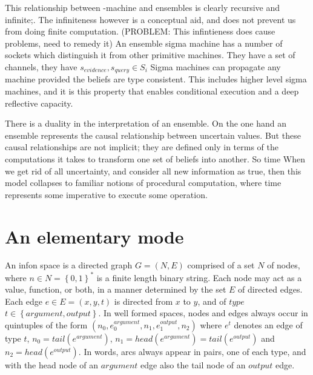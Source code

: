 This relationship between \sigma-machine and ensembles is clearly recursive and infinite;.  The infiniteness however is a conceptual aid, and does not prevent us from doing finite computation. (PROBLEM: This infintieness does cause problems, need to remedy it)
An ensemble sigma machine has a number of sockets which distinguish it from other primitive machines.  They have a set of channels, they have $s_{evidence}, s_{query} \in S_i$
Sigma machines can propagate any machine provided the beliefs are type consistent.
This includes higher level sigma machines, and it is this property that enables conditional execution and a deep reflective capacity.

There is a duality in the interpretation of an ensemble.
On the one hand an ensemble represents the causal relationship between uncertain values.
But these causal relationships are not implicit; they are defined only in terms of the computations it takes to transform one set of beliefs into another.
So time  When we get rid of all uncertainty, and consider all new information as true, then this model collapses to familiar notions of procedural computation, where time represents some imperative to execute some operation.

\section{An elementary mode}

An infon space is a directed graph $G=\left(N,E\right)$ comprised of a set $N$ of nodes, where $n \in N = \left\{0,1\right\}^*$ is a finite length binary string.
Each node may act as a value, function, or both, in a manner determined by the set $E$ of directed edges.
Each edge $e \in E = \left(x,y,t\right)$ is directed from $x$ to $y$, and of $type$ $t \in \left\{argument, output\right\}$.
In well formed spaces, nodes and edges always occur in quintuples of the form $\left( n_0, e_0^{argument}, n_1, e_1^{output}, n_2  \right)$ where $e^t$ denotes an edge of type $t$, $n_0=tail(e^{argument})$, $n_1=head(e^{argument})=tail(e^{output})$ and $n_2=head(e^{output})$.
In words, arcs always appear in pairs, one of each type, and with the head node of an $argument$ edge also the tail node of an $output$ edge.

